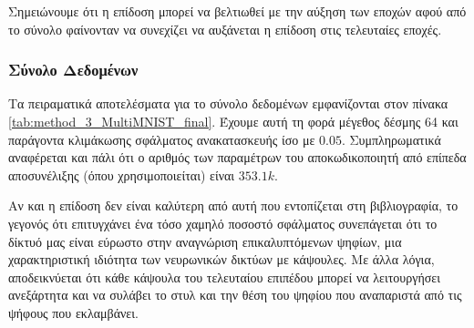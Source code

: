 Σημειώνουμε ότι η επίδοση μπορεί να βελτιωθεί με την αύξηση των εποχών αφού από το σύνολο  φαίνονταν να συνεχίζει να αυξάνεται η επίδοση στις τελευταίες εποχές.

\subsubsection{Σύνολο Δεδομένων }

Τα πειραματικά αποτελέσματα για το σύνολο δεδομένων  εμφανίζονται στον πίνακα \ref{tab:method_3_MultiMNIST_final}. Έχουμε αυτή τη φορά μέγεθος δέσμης 64 και παράγοντα κλιμάκωσης σφάλματος ανακατασκευής ίσο με $0.05$. Συμπληρωματικά αναφέρεται και πάλι ότι ο αριθμός των παραμέτρων του αποκωδικοποιητή από επίπεδα αποσυνέλιξης (όπου χρησιμοποιείται) είναι $353.1k$.

\begin{table}[h]
    \begin{center}
    \end{center}
    \caption[]{\label{tab:method_3_MultiMNIST_final}Επίδοση των αλγορίθμων της μεθόδου 3 στο σύνολο δεδομένων , όταν χρησιμοποιούνται 30 εποχές για την εκπαίδευση του μοντέλου με μέγεθος δέσμης 64.} 
\end{table}

Αν και η επίδοση δεν είναι καλύτερη από αυτή που εντοπίζεται στη βιβλιογραφία, το γεγονός ότι επιτυγχάνει ένα τόσο χαμηλό ποσοστό σφάλματος συνεπάγεται ότι το δίκτυό μας είναι εύρωστο στην αναγνώριση επικαλυπτόμενων ψηφίων, μια χαρακτηριστική ιδιότητα των νευρωνικών δικτύων με κάψουλες. Με άλλα λόγια, αποδεικνύεται ότι κάθε κάψουλα του τελευταίου επιπέδου μπορεί να λειτουργήσει ανεξάρτητα και να συλάβει το στυλ και την θέση του ψηφίου που αναπαριστά από τις ψήφους που εκλαμβάνει.

